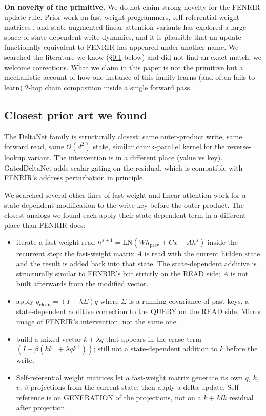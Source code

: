 \documentclass[11pt]{article}
\begin{document}
\textbf{On novelty of the primitive.} We do not claim strong novelty
for the FENRIR update rule. Prior work on fast-weight programmers,
self-referential weight matrices \citep{schlag2021deltanet}, and
state-augmented linear-attention variants has explored a large space
of state-dependent write dynamics, and it is plausible that an update
functionally equivalent to FENRIR has appeared under another name. We
searched the literature we know
(\S\ref{sec:related:closest} below) and did not find an exact match;
we welcome corrections. What we claim in this paper is not the
primitive but a mechanistic account of how one instance of this
family learns (and often fails to learn) 2-hop chain composition
inside a single forward pass.

\subsection{Closest prior art we found}
\label{sec:related:closest}

The DeltaNet family
\citep{schlag2021deltanet,yang2024parallelizing,yang2024gated} is
structurally closest: same outer-product write, same forward read,
same $\mathcal{O}(d^2)$ state, similar chunk-parallel kernel for the
reverse-lookup variant. The intervention is in a different place
(value vs key). GatedDeltaNet \citep{yang2024gated} adds scalar
gating on the residual, which is compatible with FENRIR's address
perturbation in principle.

We searched several other lines of fast-weight and linear-attention
work for a state-dependent modification to the write key before the
outer product. The closest analogs we found each apply their
state-dependent term in a different place than FENRIR does:

\begin{itemize}
\item \citet{ba2016fastweights} iterate a fast-weight read
      $h^{s+1} = \mathrm{LN}(W h_{\text{prev}} + C x + A h^s)$
      inside the recurrent step: the fast-weight matrix $A$ is read
      with the current hidden state and the result is added back into
      that state. The state-dependent additive is structurally
      similar to FENRIR's but strictly on the READ side; $A$ is not
      built afterwards from the modified vector.
\item \citet{ccq2026} apply $q_{\text{clean}} =
      (I - \lambda \Sigma) q$ where $\Sigma$ is a running covariance
      of past keys, a state-dependent additive correction to the
      QUERY on the READ side. Mirror image of FENRIR's intervention,
      not the same one.
\item \citet{qdelta2026} build a mixed vector $k + \lambda q$ that
      appears in the erase term $(I - \beta (k k^{\top} + \lambda q
      k^{\top}))$; still not a state-dependent addition to $k$ before
      the write.
\item Self-referential weight matrices \citep{irie2022srwm} let a
      fast-weight matrix generate its own $q$, $k$, $v$, $\beta$
      projections from the current state, then apply a delta update.
      Self-reference is on GENERATION of the projections, not on a
      $k + M k$ residual after projection.
\end{itemize}
\end{document}
